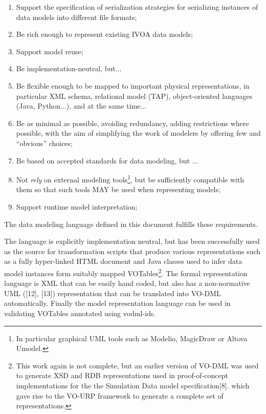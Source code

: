 \documentclass[10pt,a4paper]{ivoa}
\begin{document}
\begin{enumerate}
\def\labelenumi{\arabic{enumi}.}
\item
  Support the specification of serialization strategies for serializing
  instances of data models into different file formats;
\item
  Be rich enough to represent existing IVOA data models;
\item
  Support model reuse;
\item
  Be implementation-neutral, but...
\item
  Be flexible enough to be mapped to important physical representations,
  in particular XML schema, relational model (TAP), object-oriented
  languages (Java, Python...), and at the same time...
\item
  Be as minimal as possible, avoiding redundancy, adding restrictions
  where possible, with the aim of simplifying the work of modelers by
  offering few and ``obvious'' choices;
\item
  Be based on accepted standards for data modeling, but ...
\item
  Not \emph{rely} on external modeling tools\footnote{In particular
    graphical UML tools such as Modelio, MagicDraw or Altova Umodel.},
  but be sufficiently compatible with them so that such tools MAY be
  used when representing models;
\item
  Support runtime model interpretation;
\end{enumerate}

The data modeling language defined in this document fulfills these
requirements.

The language is explicitly implementation neutral, but has been
successfully used as the source for transformation scripts that produce
various representations such as a fully hyper-linked HTML document and
Java classes used to infer data model instances form suitably mapped
VOTables\footnote{This work again is not complete, but an earlier
  version of VO-DML was used to generate XSD and RDB representations
  used in proof-of-concept implementations for the the Simulation Data
  model specification{[}8{]}. which gave rise to the VO-URP framework to
  generate a complete set of representations.}. The formal
representation language is XML that can be easily hand coded, but also
has a non-normative UML ({[}12{]}, {[}13{]}) representation that can be
translated into VO-DML automatically. Finally the model representation
language can be used in validating VOTables annotated using vodml-ids.
\end{document}
